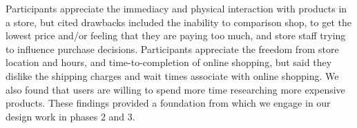 Participants appreciate the immediacy and physical interaction with products in a store, but cited drawbacks included the inability to comparison shop, to get the lowest price and/or feeling that they are paying too much, and store staff trying to influence purchase decisions.  Participants appreciate the freedom from store location and hours,   and time-to-completion of online shopping,  but said they dislike the shipping charges and wait times associate with online shopping. We also found that users are willing to spend more time researching more expensive products. These findings provided a foundation from which we engage in our design work in phases 2 and 3.
